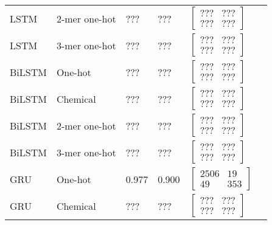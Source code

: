 \begin{longtable}{llllll}
    LSTM & 2-mer one-hot & ??? & ??? & 
	$\begin{bmatrix}
        ??? & ???\\ 
        ??? & ???
    \end{bmatrix}$
    \\

    LSTM & 3-mer one-hot & ??? & ??? & 
	$\begin{bmatrix}
        ??? & ???\\ 
        ??? & ???
    \end{bmatrix}$
    \\\midrule
    

    BiLSTM & One-hot & ??? & ??? &
    $\begin{bmatrix}
        ??? & ???\\ 
        ??? & ???
    \end{bmatrix}$
    \\

    BiLSTM & Chemical & ??? & ??? &
    $\begin{bmatrix}
        ??? & ???\\ 
        ??? & ???
    \end{bmatrix}$
    \\

    BiLSTM & 2-mer one-hot & ??? & ??? &
    $\begin{bmatrix}
        ??? & ???\\ 
        ??? & ???
    \end{bmatrix}$
    \\

    BiLSTM & 3-mer one-hot & ??? & ??? &
    $\begin{bmatrix}
        ??? & ???\\ 
        ??? & ???
    \end{bmatrix}$
    \\\midrule
            

    GRU & One-hot & 0.977 & 0.900 &
    $\begin{bmatrix}
        2506 & 19\\ 
        49 & 353
    \end{bmatrix}$
    \\

    GRU & Chemical & ??? & ??? &
    $\begin{bmatrix}
        ??? & ???\\ 
        ??? & ???
    \end{bmatrix}$
    \\


\end{longtable}
